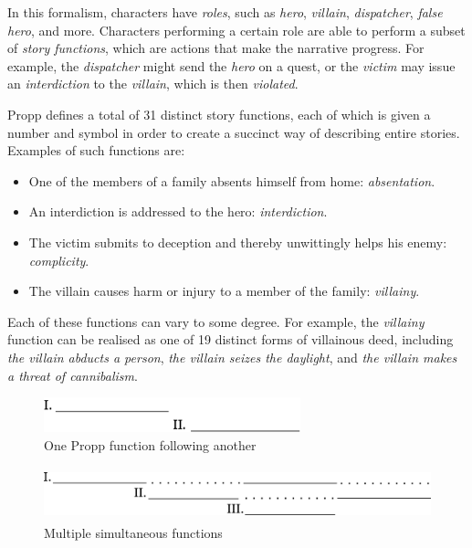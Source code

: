 \documentclass[11pt]{report}
\begin{document}
In this formalism, characters have \emph{roles}, such as \emph{hero}, \emph{villain}, \emph{dispatcher}, \emph{false hero}, and more. Characters performing a certain role are able to perform a subset of \emph{story functions}, which are actions that make the narrative progress. For example, the \emph{dispatcher} might send the \emph{hero} on a quest, or the \emph{victim} may issue an \emph{interdiction} to the \emph{villain}, which is then \emph{violated}.

Propp defines a total of 31 distinct story functions, each of which is given a number and symbol in order to create a succinct way of describing entire stories. Examples of such functions are:

\begin{itemize}
  \item One of the members of a family absents himself from home: \emph{absentation}.
  \item An interdiction is addressed to the hero: \emph{interdiction}.
  \item The victim submits to deception and thereby unwittingly helps his enemy: \emph{complicity}.
  \item The villain causes harm or injury to a member of the family: \emph{villainy}.
\end{itemize}

Each of these functions can vary to some degree. For example, the \emph{villainy} function can be realised as one of 19 distinct forms of villainous deed, including \emph{the villain abducts a person}, \emph{the villain seizes the daylight}, and \emph{the villain makes a threat of cannibalism}.

\begin{figure}[!t]
\centerline{\includegraphics[height=0.4in]{propp1.png}}
\caption{One Propp function following another}\label{fig:propp1}
\end{figure}

\begin{figure}[!t]
\centerline{\includegraphics[height=0.6in]{propp2.png}}
\caption{Multiple simultaneous functions}\label{fig:propp2}
\end{figure}
\end{document}
